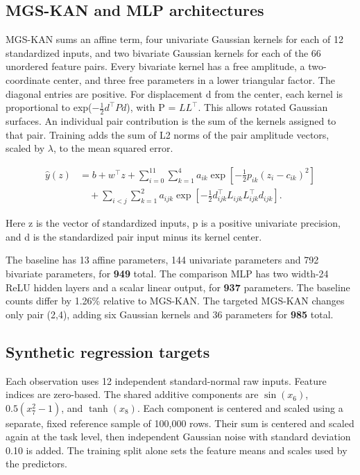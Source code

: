 \documentclass[11pt]{article}
\numberwithin{equation}{section}
\begin{document}
\subsection{MGS-KAN and MLP architectures}

MGS-KAN sums an affine term, four univariate Gaussian kernels for each of 12 standardized
inputs, and two bivariate Gaussian kernels for each of the 66 unordered feature pairs. Every
bivariate kernel has a free amplitude, a two-coordinate center, and three free parameters in a
lower triangular factor. The diagonal entries are positive. For displacement d from the
center, each kernel is proportional to exp(\ensuremath{-}\ensuremath{\tfrac12}\(d^\top P d\)),
with P = \(LL^\top\). This allows rotated Gaussian surfaces. An individual pair contribution
is the sum of the kernels assigned to that pair. Training adds the sum of L2 norms of the pair
amplitude vectors, scaled by \ensuremath{\lambda}, to the mean squared error.

\begin{equation}
\begin{aligned}
\widehat y(z)
 &= b+w^\top z+
 \sum_{i=0}^{11}\sum_{k=1}^{4}a_{ik}
       \exp\!\left[-\tfrac12p_{ik}(z_i-c_{ik})^2\right]\\
 &\quad+\sum_{i<j}\sum_{k=1}^{2}a_{ijk}
       \exp\!\left[-\tfrac12d_{ijk}^\top L_{ijk}L_{ijk}^\top d_{ijk}\right].
\end{aligned}
\label{eq:report-scalar-model}
\end{equation}

Here z is the vector of standardized inputs, p is a positive univariate precision, and d is
the standardized pair input minus its kernel center.

The baseline has 13 affine parameters, 144 univariate parameters and 792 bivariate parameters,
for \textbf{949} total. The comparison MLP has two width-24 ReLU hidden layers and a scalar
linear output, for \textbf{937} parameters. The baseline counts differ by 1.26\% relative to
MGS-KAN. The targeted MGS-KAN changes only pair (2,4), adding six Gaussian kernels and 36
parameters for \textbf{985} total.

\subsection{Synthetic regression targets}

Each observation uses 12 independent standard-normal raw inputs. Feature indices are
zero-based. The shared additive components are \(\sin(x_6)\), \(0.5(x_7^2-1)\), and
\(\tanh(x_8)\). Each component is centered and scaled using a separate, fixed reference sample
of 100,000 rows. Their sum is centered and scaled again at the task level, then independent
Gaussian noise with standard deviation 0.10 is added. The training split alone sets the
feature means and scales used by the predictors.
\end{document}
